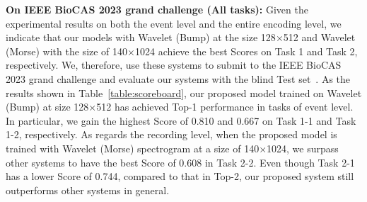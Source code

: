 \documentclass[conference]{IEEEtran}
\begin{document}
\textbf{On IEEE BioCAS 2023 grand challenge (All tasks):} Given the experimental results on both the event level and the entire encoding level, we indicate that our models with Wavelet (Bump) at the size 128$\times$512 and Wavelet (Morse) with the size of 140$\times$1024 achieve the best Scores on Task 1 and Task 2, respectively.
We, therefore, use these systems to submit to the IEEE BioCAS 2023 grand challenge and evaluate our systems with the blind Test set~\cite{scoreboard}.
As the results shown in Table~\ref{table:scoreboard}, our proposed model trained on Wavelet (Bump) at size 128$\times$512 has achieved Top-1 performance in tasks of event level. 
In particular, we gain the highest Score of 0.810 and 0.667 on Task 1-1 and Task 1-2, respectively. 
As regards the recording level, when the proposed model is trained with Wavelet (Morse) spectrogram at a size of 140$\times$1024, we surpass other systems to have the best Score of 0.608 in Task 2-2. 
Even though Task 2-1 has a lower Score of 0.744, compared to that in Top-2, our proposed system still outperforms other systems in general. 
\end{document}
